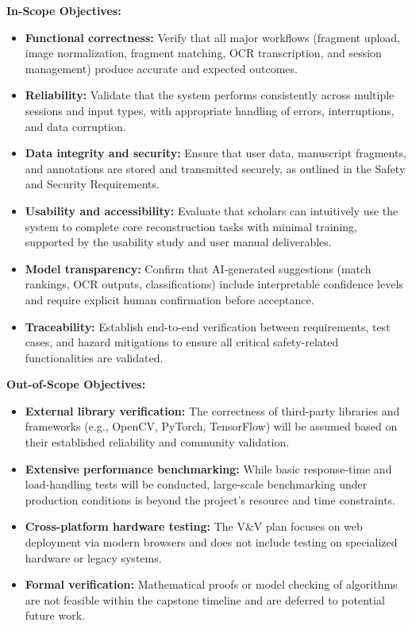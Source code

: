 \documentclass[12pt, titlepage]{article}
\begin{document}
\textbf{In-Scope Objectives:}
\begin{itemize}
    \item \textbf{Functional correctness:} Verify that all major workflows (fragment upload, image normalization, fragment matching, OCR transcription, and session management) produce accurate and expected outcomes.
    \item \textbf{Reliability:} Validate that the system performs consistently across multiple sessions and input types, with appropriate handling of errors, interruptions, and data corruption.
    \item \textbf{Data integrity and security:} Ensure that user data, manuscript fragments, and annotations are stored and transmitted securely, as outlined in the Safety and Security Requirements.
    \item \textbf{Usability and accessibility:} Evaluate that scholars can intuitively use the system to complete core reconstruction tasks with minimal training, supported by the usability study and user manual deliverables.
    \item \textbf{Model transparency:} Confirm that AI-generated suggestions (match rankings, OCR outputs, classifications) include interpretable confidence levels and require explicit human confirmation before acceptance.
    \item \textbf{Traceability:} Establish end-to-end verification between requirements, test cases, and hazard mitigations to ensure all critical safety-related functionalities are validated.
\end{itemize}

\textbf{Out-of-Scope Objectives:}
\begin{itemize}
    \item \textbf{External library verification:} The correctness of third-party libraries and frameworks (e.g., OpenCV, PyTorch, TensorFlow) will be assumed based on their established reliability and community validation.
    \item \textbf{Extensive performance benchmarking:} While basic response-time and load-handling tests will be conducted, large-scale benchmarking under production conditions is beyond the project’s resource and time constraints.
    \item \textbf{Cross-platform hardware testing:} The V\&V plan focuses on web deployment via modern browsers and does not include testing on specialized hardware or legacy systems.
    \item \textbf{Formal verification:} Mathematical proofs or model checking of algorithms are not feasible within the capstone timeline and are deferred to potential future work.
\end{itemize}
\end{document}
